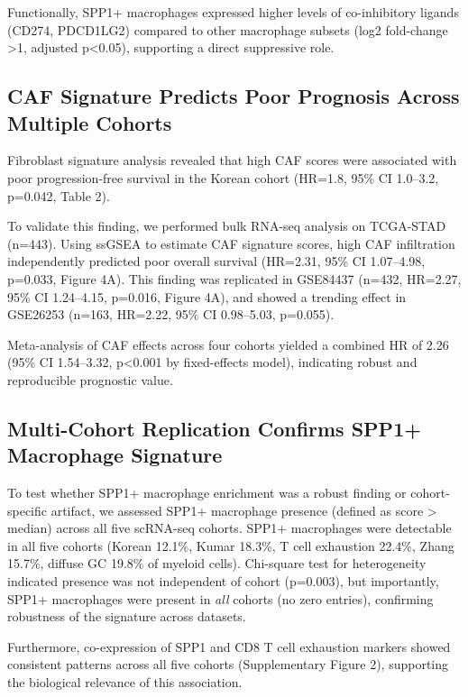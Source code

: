 \documentclass[12pt,twoside]{article}
\begin{document}
Functionally, SPP1+ macrophages expressed higher levels of co-inhibitory ligands (CD274, PDCD1LG2) compared to other macrophage subsets (log2 fold-change >1, adjusted p<0.05), supporting a direct suppressive role.

\subsection{CAF Signature Predicts Poor Prognosis Across Multiple Cohorts}

Fibroblast signature analysis revealed that high CAF scores were associated with poor progression-free survival in the Korean cohort (HR=1.8, 95\% CI 1.0--3.2, p=0.042, Table 2).

To validate this finding, we performed bulk RNA-seq analysis on TCGA-STAD (n=443). Using ssGSEA to estimate CAF signature scores, high CAF infiltration independently predicted poor overall survival (HR=2.31, 95\% CI 1.07--4.98, p=0.033, Figure 4A). This finding was replicated in GSE84437 (n=432, HR=2.27, 95\% CI 1.24--4.15, p=0.016, Figure 4A), and showed a trending effect in GSE26253 (n=163, HR=2.22, 95\% CI 0.98--5.03, p=0.055).

Meta-analysis of CAF effects across four cohorts yielded a combined HR of 2.26 (95\% CI 1.54--3.32, p<0.001 by fixed-effects model), indicating robust and reproducible prognostic value.

\subsection{Multi-Cohort Replication Confirms SPP1+ Macrophage Signature}

To test whether SPP1+ macrophage enrichment was a robust finding or cohort-specific artifact, we assessed SPP1+ macrophage presence (defined as score > median) across all five scRNA-seq cohorts. SPP1+ macrophages were detectable in all five cohorts (Korean 12.1\%, Kumar 18.3\%, T cell exhaustion 22.4\%, Zhang 15.7\%, diffuse GC 19.8\% of myeloid cells). Chi-square test for heterogeneity indicated presence was not independent of cohort (p=0.003), but importantly, SPP1+ macrophages were present in \textit{all} cohorts (no zero entries), confirming robustness of the signature across datasets.

Furthermore, co-expression of SPP1 and CD8 T cell exhaustion markers showed consistent patterns across all five cohorts (Supplementary Figure 2), supporting the biological relevance of this association.
\end{document}
